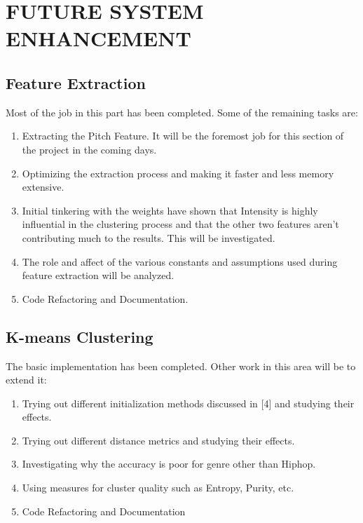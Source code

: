 \newpage
\section{FUTURE SYSTEM ENHANCEMENT}

                     \subsection{Feature Extraction}
                     Most of the job in this part has been completed. Some of the remaining tasks are:
                     \begin{enumerate}
                             \item Extracting the Pitch Feature. It will be the foremost job for this section of the project in the coming days. 
                             \item Optimizing the extraction process and making it faster and less memory extensive.
                             \item Initial tinkering with the weights have shown that Intensity is highly influential in the clustering process and that the other two features aren't contributing much to the results. This will be investigated.
                             \item The role and affect of the various constants and assumptions used during feature extraction will be analyzed. 
                             \item Code Refactoring and Documentation.
                     \end{enumerate}

                     \subsection{K-means Clustering}
                     The basic implementation has been completed. Other work in this area will be to extend it:
                     \begin{enumerate}
                             \item Trying out different initialization methods discussed in [4] and studying their effects.
                             \item Trying out different distance metrics and studying their effects.
                             \item Investigating why the accuracy is poor for genre other than Hiphop.
                             \item Using measures for cluster quality such as Entropy, Purity, etc. 
                             \item Code Refactoring and Documentation
                     \end{enumerate}

